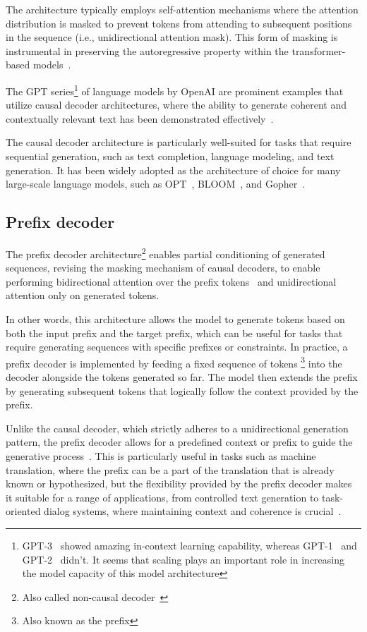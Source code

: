 The architecture typically employs self-attention mechanisms where the attention distribution is masked to prevent tokens from attending to subsequent positions in the sequence (i.e., unidirectional attention mask).
This form of masking is instrumental in preserving the autoregressive property within the transformer-based models~\cite{radford2019language}.

The GPT series\footnote{GPT-3~\cite{brown2020language} showed amazing in-context learning capability, whereas GPT-1~\cite{radford2018improving} and GPT-2~\cite{radford2019language} didn't. It seems that scaling plays an important role in increasing the model capacity of this model architecture} of language models by OpenAI are prominent examples that utilize causal decoder architectures, where the ability to generate coherent and contextually relevant text has been demonstrated effectively~\cite{brown2020language}.

The causal decoder architecture is particularly well-suited for tasks that require sequential generation, such as text completion, language modeling, and text generation.
It has been widely adopted as the architecture of choice for many large-scale language models, such as OPT~\cite{zhang2022opt}, BLOOM~\cite{workshop2023bloom}, and Gopher~\cite{rae2021scaling}.

\subsection{Prefix decoder}
\label{subsec:prefix-decoder}

The prefix decoder architecture\footnote{Also called non-causal decoder~\cite{zhang2022examining}} enables partial conditioning of generated sequences, revising the masking mechanism of causal decoders, to enable performing bidirectional attention over the prefix tokens~\cite{dong2019unified} and unidirectional attention only on generated tokens.

In other words, this architecture allows the model to generate tokens based on both the input prefix and the target prefix, which can be useful for tasks that require generating sequences with specific prefixes or constraints.
In practice, a prefix decoder is implemented by feeding a fixed sequence of tokens \footnote{Also known as the prefix} into the decoder alongside the tokens generated so far.
The model then extends the prefix by generating subsequent tokens that logically follow the context provided by the prefix.

Unlike the causal decoder, which strictly adheres to a unidirectional generation pattern, the prefix decoder allows for a predefined context or prefix to guide the generative process~\cite{li2021prefixtuning}.
This is particularly useful in tasks such as machine translation, where the prefix can be a part of the translation that is already known or hypothesized, but the flexibility provided by the prefix decoder makes it suitable for a range of applications, from controlled text generation to task-oriented dialog systems, where maintaining context and coherence is crucial~\cite{li2022ptuning}.

